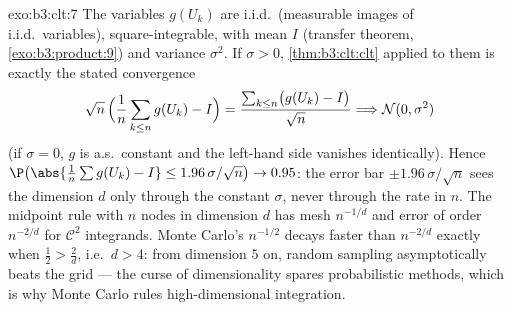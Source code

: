 \begin{solution}{exo:b3:clt:7}
The variables $g(U_k)$ are i.i.d.\ (measurable images of
i.i.d.\ variables), square-integrable, with mean $I$
(transfer theorem, \cref{exo:b3:product:9}) and variance
$\sigma^2$. If $\sigma > 0$, \cref{thm:b3:clt:clt} applied
to them is exactly the stated convergence
\[
\sqrt n\,\Bigl(\frac1n\sum_{k\leq n}g(U_k) - I\Bigr) =
\frac{\sum_{k\leq n}\bigl(g(U_k) - I\bigr)}{\sqrt n}
\Longrightarrow \mathcal N(0, \sigma^2)
\]
(if $\sigma = 0$, $g$ is a.s.\ constant and the left-hand
side vanishes identically). Hence
$\P\bigl(\abs{\frac1n\sum g(U_k) - I} \leq
1.96\,\sigma/\sqrt n\bigr) \to 0.95$: the error bar $\pm
1.96\,\sigma/\sqrt n$ sees the dimension $d$ only through
the constant $\sigma$, never through the rate in $n$. The
midpoint rule with $n$ nodes in dimension $d$ has mesh
$n^{-1/d}$ and error of order $n^{-2/d}$ for $\mathcal C^2$
integrands. Monte Carlo's $n^{-1/2}$ decays faster than
$n^{-2/d}$ exactly when $\frac12 > \frac2d$, i.e.\ $d > 4$:
from dimension $5$ on, random sampling asymptotically beats
the grid --- the curse of dimensionality spares
probabilistic methods, which is why Monte Carlo rules
high-dimensional integration.
\end{solution}

